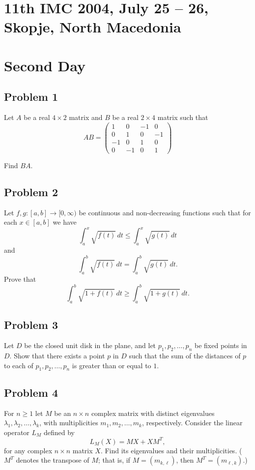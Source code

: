 \documentclass{article}
\begin{document}
\pagestyle{plain}

\section*{11th IMC 2004, July 25 -- 26, Skopje, North Macedonia}

\section*{Second Day}

\subsection*{Problem 1}
Let $A$ be a real $4 \times 2$ matrix and $B$ be a real $2 \times 4$ matrix such that
\[
AB = \begin{pmatrix}
1 & 0 & -1 & 0 \\
0 & 1 & 0 & -1 \\
-1 & 0 & 1 & 0 \\
0 & -1 & 0 & 1
\end{pmatrix}
\]

Find $BA$.

\subsection*{Problem 2}
Let $f, g \colon [a,b] \to [0, \infty)$ be continuous and non-decreasing functions
such that for each $x \in [a,b]$ we have
\[
\int_a^x \sqrt{f(t)}\,dt \leq \int_a^x \sqrt{g(t)}\,dt
\]
and
\[
\int_a^b \sqrt{f(t)}\,dt = \int_a^b \sqrt{g(t)}\,dt.
\]
Prove that
\[
\int_a^b \sqrt{1 + f(t)}\,dt \geq \int_a^b \sqrt{1 + g(t)}\,dt.
\]

\subsection*{Problem 3}
Let $D$ be the closed unit disk in the plane, and let $p_1, p_2, \ldots, p_n$ be fixed points in $D$.
Show that there exists a point $p$ in $D$ such that the sum of the distances of $p$
to each of $p_1, p_2, \ldots, p_n$ is greater than or equal to $1$.

\subsection*{Problem 4}
For $n \geq 1$ let $M$ be an $n \times n$ complex matrix with distinct eigenvalues
$\lambda_1, \lambda_2, \ldots, \lambda_k$, with multiplicities $m_1, m_2, \ldots, m_k$, respectively.
Consider the linear operator $L_M$ defined by
\[
L_M(X) = MX + X M^T,
\]
for any complex $n \times n$ matrix $X$. Find its eigenvalues and their multiplicities.
($M^T$ denotes the transpose of $M$; that is, if $M = (m_{k,\ell})$, then $M^T = (m_{\ell,k})$.)
\end{document}
